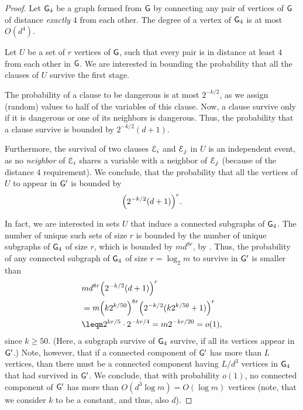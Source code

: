 \begin{proof}
    Let $\mathsf{G}_4$ be a graph formed from $\mathsf{G}$ by connecting any
    pair of vertices of $\mathsf{G}$ of distance {\em exactly} $4$
    from each other. The degree of a vertex of $\mathsf{G}_4$ is at
    most $O(d^4)$. 

    Let $U$ be a set of $r$ vertices of $\mathsf{G}$, such that
    every pair is in distance at least $4$ from each other
    in $\mathsf{G}$. We are interested in bounding the probability
    that all the clauses of $U$ survive the first stage. 
    
    The probability of a clause to be dangerous is at most $2^{-k/2}$,
    as we assign (random) values to half of the variables of this
    clause. Now, a clause survive only if it is dangerous or one of
    its neighbors is dangerous.  Thus, the probability that a clause
    survive is bounded by $2^{-k/2}(d+1)$. 

    Furthermore, the survival of two clauses $\EuScript{E}_i$ and $\EuScript{E}_j$ in $U$ is
    an independent event, as no \emph{neighbor} of $\EuScript{E}_i$ shares a
    variable with a neighbor of $\EuScript{E}_j$ (because of the distance $4$
    requirement). We conclude, that the probability that all the
    vertices of $U$ to appear in $\mathsf{G}'$ is bounded by
    \begin{align*}
    \pth{2^{-k/2}(d+1)}^{r}.
    \end{align*}
    
    In fact, we are interested in sets $U$ that induce a connected
    subgraphs of $\mathsf{G}_4$. The number  of unique such sets of size $r$ is
    bounded by the number of unique subgraphs of $\mathsf{G}_4$ of size $r$,
    which is bounded by $m d^{8r}$, by . Thus,
    the probability of any connected subgraph of $\mathsf{G}_4$ of size $r =
    \log_2 {m}$ to survive in $\mathsf{G}'$ is smaller than
    \begin{align*}
        &m d^{8r} \pth{2^{-k/2}(d+1)}^{r}%
        \\&=%
        m \pth{k2^{k/50}}^{8r } \pth{2^{-k/2}(k2^{k/50}+1)}^{r}%
        \\&\leq%
        m 2^{kr/5} \cdot 2^{-kr/4}%
        =%
        m 2^{-kr/20}%
        =%
        o(1),
    \end{align*}
    since $k \geq 50$.  (Here, a subgraph survive of $\mathsf{G}_4$
    survive, if all its vertices appear in $\mathsf{G}'$.)  Note, however,
    that if a connected component of $\mathsf{G}'$ has more than $L$
    vertices, than there must be a connected component having $L/d^3$
    vertices in $\mathsf{G}_4$ that had survived in $\mathsf{G}'$. We
    conclude, that with probability $o(1)$, no connected component of
    $\mathsf{G}'$ has more than $O(d^3 \log{m}) = O(\log{m})$ vertices
    (note, that we consider $k$ to be a constant, and thus, also $d$).
\end{proof}

